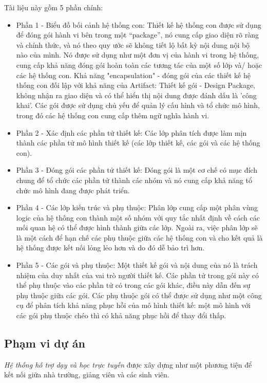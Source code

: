 \documentclass[./../main.tex]{subfiles}
\begin{document}
Tài liệu này gồm 5 phần chính:
\begin{itemize}
\item Phần 1 - Biểu đồ bối cảnh hệ thống con: Thiết kế hệ thống con được sử dụng để đóng gói hành vi bên trong một “package”, nó cung cấp giao diện rõ ràng và chính thức, và nó theo quy ước sẽ không tiết lộ bất kỳ nội dung nội bộ nào của mình. Nó được sử dụng như một đơn vị của hành vi trong hệ thống, cung cấp khả năng đóng gói hoàn toàn các tương tác của một số lớp và/ hoặc các hệ thống con. Khả năng "encapsulation" - đóng gói của các thiết kế hệ thống con đối lập với khả năng của Artifact: Thiết kế gói - Design Package, không nhận ra giao diện và có thể hiển thị nội dung được đánh dấu là 'công khai'. Các gói được sử dụng chủ yếu để quản lý cấu hình và tổ chức mô hình, trong đó các hệ thống con cung cấp thêm ngữ nghĩa hành vi.
	\item Phần 2 - Xác định các phần tử thiết kế: Các lớp phân tích được làm mịn thành các phần tử mô hình thiết kế (các lớp thiết kế, các gói và các hệ thống con).
	\item Phần 3 - Đóng gói các phần tử thiết kế: Đóng gói là một cơ chế có mục đích chung để tổ chức các phần tử thành các nhóm và nó cung cấp khả năng tổ chức mô hình đang được phát triển. 
	\item Phần 4 - Các lớp kiến trúc và phụ thuộc: Phân lớp cung cấp một phân vùng logic của hệ thống con thành một số nhóm với quy tắc nhất định về cách các mối quan hệ có thể được hình thành giữa các lớp. Ngoài ra, việc phân lớp sẽ là một cách để hạn chế các phụ thuộc giữa các hệ thống con và cho kết quả là hệ thống được kết nối lỏng lẻo hơn và do đó dễ bảo trì hơn.
	\item Phần 5 - Các gói và phụ thuộc: Một thiết kế gói và nội dung của nó là trách nhiệm của duy nhất của vai trò người thiết kế. Các phần tử trong gói này có thể phụ thuộc vào các phần tử có trong các gói khác, điều này dẫn đến sự phụ thuộc giữa các gói. Các phụ thuộc gói có thể được sử dụng như một công cụ để phân tích khả năng phục hồi của mô hình thiết kế: một mô hình với các gói phụ thuộc chéo thì có khả năng phục hồi để thay đổi thấp.
\end{itemize}

\subsection{Phạm vi dự án}

\textit{Hệ thống hỗ trợ dạy và học trực tuyến} được xây dựng như một phương tiện để kết nối giữa nhà trường, giảng viên và các sinh viên.
\end{document}
